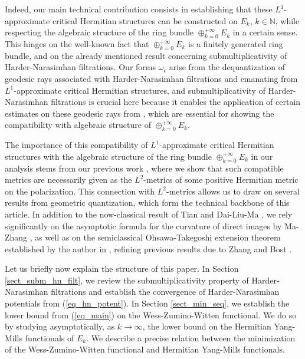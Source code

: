 \documentclass[12pt]{article}
\numberwithin{equation}{section}
\theoremstyle{theorem}
\theoremstyle{definition}
\theoremstyle{remark}
\newcommand{\nat}{\mathbb{N}}
\begin{document}
	Indeed, our main technical contribution consists in establishing that these $L^1$-approximate critical Hermitian structures can be constructed on $E_k$, $k \in \nat$, while respecting the algebraic structure of the ring bundle $\oplus_{k = 0}^{+ \infty} E_k$ in a certain sense.
	This hinges on the well-known fact that $\oplus_{k = 0}^{+ \infty} E_k$ is a finitely generated ring bundle, and on the already mentioned result concerning submultiplicativity of Harder-Narasimhan filtrations.
	Our forms $\omega_{\epsilon}$ arise from the dequantization of geodesic rays associated with Harder-Narasimhan filtrations and emanating from $L^1$-approximate critical Hermitian structures, and submultiplicativity of Harder-Narasimhan filtrations is crucial here because it enables the application of certain estimates on these geodesic rays from \cite{FinTits}, which are essential for showing the compatibility with algebraic structure of $\oplus_{k = 0}^{+ \infty} E_k$.
	\par 
	The importance of this compatibility of $L^1$-approximate critical Hermitian structures with the algebraic structure of the ring bundle $\oplus_{k = 0}^{+ \infty} E_k$ in our analysis stems from our previous work \cite{FinSecRing}, where we show that such compatible metrics are necessarily given as the $L^2$-metrics of some positive Hermitian metric on the polarization.
	This connection with $L^2$-metrics allows us to draw on several results from geometric quantization, which form the technical backbone of this article.
	In addition to the now-classical result of Tian \cite{TianBerg} and Dai-Liu-Ma \cite{DaiLiuMa}, we rely significantly on the asymptotic formula for the curvature of direct images by Ma-Zhang \cite{MaZhangSuperconnBKPubl}, as well as on the semiclassical Ohsawa-Takegoshi extension theorem established by the author in \cite{FinOTAs},  \cite{FinOTRed} refining previous results due to Zhang \cite{ZhangPosLinBun} and Bost \cite{BostDwork}.
	\par 
	Let us briefly now explain the structure of this paper.
	In Section \ref{sect_subm_hn_filt}, we review the submultiplicativity property of Harder-Narasimhan filtrations and establish the convergence of Harder-Narasimhan potentials from (\ref{eq_hn_potent}).
	In Section \ref{sect_min_seq}, we establish the lower bound from (\ref{eq_main}) on the Wess-Zumino-Witten functional.
	We do so by studying asymptotically, as $k \to \infty$, the lower bound on the Hermitian Yang-Mills functionals of $E_k$.
	We describe a precise relation between the minimization of the Wess-Zumino-Witten functional and Hermitian Yang-Mills functionals.
\end{document}
